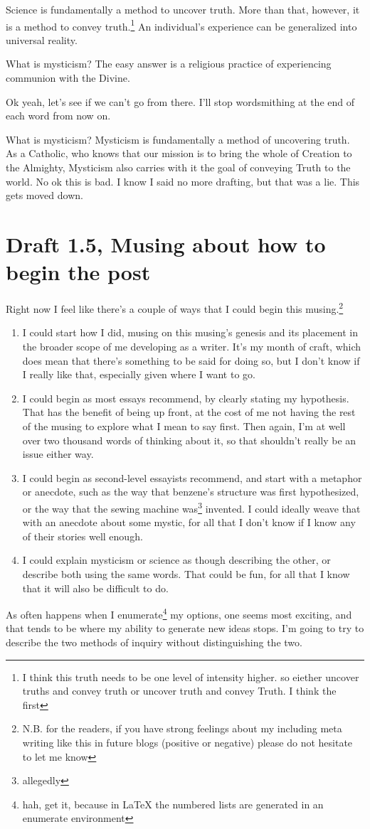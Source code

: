 \documentclass[12pt]{article}[titlepage]
\renewcommand{\,}{\textsuperscript{,}}
\begin{document}
Science is fundamentally a method to uncover truth.
More than that, however, it is a method to convey truth.\footnote{I think this truth needs to be one level of intensity higher. so eiether uncover truths and convey truth or uncover truth and convey Truth. I think the first}
An individual's experience can be generalized into universal reality.

What is mysticism?
The easy answer is a religious practice of experiencing communion with the Divine.

Ok yeah, let's see if we can't go from there. I'll stop wordsmithing at the end of each word from now on.

What is mysticism?
Mysticism is fundamentally a method of uncovering truth.
As a Catholic, who knows that our mission is to bring the whole of Creation to the Almighty, Mysticism also carries with it the goal of conveying Truth to the world.
No ok this is bad. I know I said no more drafting, but that was a lie. This gets moved down.


\section{Draft 1.5, Musing about how to begin the post}
Right now I feel like there's a couple of ways that I could begin this musing.\footnote{N.B. for the readers, if you have strong feelings about my including meta writing like this in future blogs (positive or negative) please do not hesitate to let me know}

\begin{enumerate}
\item I could start how I did, musing on this musing's genesis and its placement in the broader scope of me developing as a writer.
It's my month of craft, which does mean that there's something to be said for doing so, but I don't know if I really like that, especially given where I want to go.
\item I could begin as most essays recommend, by clearly stating my hypothesis.
That has the benefit of being up front, at the cost of me not having the rest of the musing to explore what I mean to say first.
Then again, I'm at well over two thousand words of thinking about it, so that shouldn't really be an issue either way.
\item I could begin as second-level essayists recommend, and start with a metaphor or anecdote, such as the way that benzene's structure was first hypothesized, or the way that the sewing machine was\footnote{allegedly} invented.
I could ideally weave that with an anecdote about some mystic, for all that I don't know if I know any of their stories well enough.
\item I could explain mysticism or science as though describing the other, or describe both using the same words.
That could be fun, for all that I know that it will also be difficult to do.
\end{enumerate}
As often happens when I enumerate\footnote{hah, get it, because in LaTeX the numbered lists are generated in an enumerate environment} my options, one seems most exciting, and that tends to be where my ability to generate new ideas stops.
I'm going to try to describe the two methods of inquiry without distinguishing the two.
\end{document}
